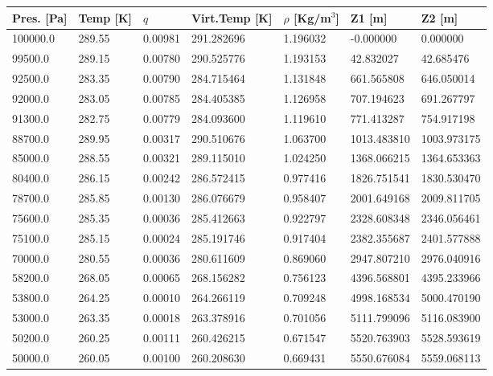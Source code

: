 \begin{tabular}{lllllll}
\toprule
Pres. [Pa] & Temp [K] &     $q$ & Virt.Temp [K] & $\rho$ [Kg/m$^3$] &       Z1 [m] &       Z2 [m] \\
\midrule
  100000.0 &   289.55 & 0.00981 &    291.282696 &          1.196032 &    -0.000000 &     0.000000 \\
   99500.0 &   289.15 & 0.00780 &    290.525776 &          1.193153 &    42.832027 &    42.685476 \\
   92500.0 &   283.35 & 0.00790 &    284.715464 &          1.131848 &   661.565808 &   646.050014 \\
   92000.0 &   283.05 & 0.00785 &    284.405385 &          1.126958 &   707.194623 &   691.267797 \\
   91300.0 &   282.75 & 0.00779 &    284.093600 &          1.119610 &   771.413287 &   754.917198 \\
   88700.0 &   289.95 & 0.00317 &    290.510676 &          1.063700 &  1013.483810 &  1003.973175 \\
   85000.0 &   288.55 & 0.00321 &    289.115010 &          1.024250 &  1368.066215 &  1364.653363 \\
   80400.0 &   286.15 & 0.00242 &    286.572415 &          0.977416 &  1826.751541 &  1830.530470 \\
   78700.0 &   285.85 & 0.00130 &    286.076679 &          0.958407 &  2001.649168 &  2009.811705 \\
   75600.0 &   285.35 & 0.00036 &    285.412663 &          0.922797 &  2328.608348 &  2346.056461 \\
   75100.0 &   285.15 & 0.00024 &    285.191746 &          0.917404 &  2382.355687 &  2401.577888 \\
   70000.0 &   280.55 & 0.00036 &    280.611609 &          0.869060 &  2947.807210 &  2976.040916 \\
   58200.0 &   268.05 & 0.00065 &    268.156282 &          0.756123 &  4396.568801 &  4395.233966 \\
   53800.0 &   264.25 & 0.00010 &    264.266119 &          0.709248 &  4998.168534 &  5000.470190 \\
   53000.0 &   263.35 & 0.00018 &    263.378916 &          0.701056 &  5111.799096 &  5116.083900 \\
   50200.0 &   260.25 & 0.00111 &    260.426215 &          0.671547 &  5520.763903 &  5528.593619 \\
   50000.0 &   260.05 & 0.00100 &    260.208630 &          0.669431 &  5550.676084 &  5559.068113 \\

\end{tabular}
